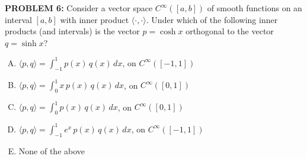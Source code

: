 \documentclass[12pt]{amsart}
\begin{document}
{\bf PROBLEM 6:}
%
Consider a vector space $C^\infty([a,b])$ of smooth functions on an
interval $[a,b]$ with inner product $\langle \cdot , \cdot \rangle$. 
Under which of the following inner products (and intervals) is the vector $p=\cosh x$ orthogonal to the vector $q=\sinh x$?
%
\begin{enumerate}[(A)]
\item $\displaystyle \langle p, q \rangle = \int_{-1}^{1} p(x)\, q(x)\, dx$, on $C^\infty([-1,1])$
\item $\displaystyle \langle p, q \rangle = \int_{0}^{1} x\, p(x)\, q(x)\, dx$, on $C^\infty([0,1])$
\item $\displaystyle \langle p, q \rangle = \int_{0}^{1} p(x)\, q(x)\, dx$, on $C^\infty([0,1])$
\item $\displaystyle \langle p, q \rangle = \int_{-1}^{1} e^{x}\, p(x)\, q(x)\, dx$, on $C^\infty([-1,1])$
\item None of the above
\end{enumerate}
%
%
%
%
%
%
\end{document}
